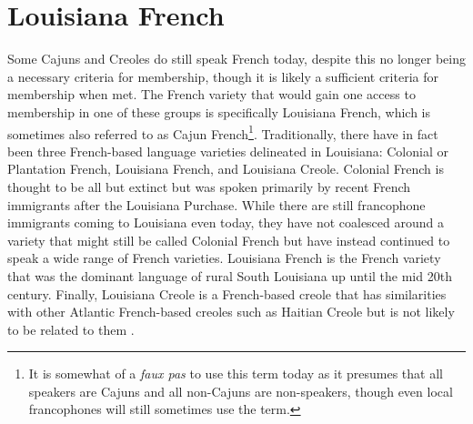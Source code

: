 \documentclass{article}\usepackage[]{graphicx}\usepackage[]{xcolor}
\newcommand{\foreign}[1]{\textit{#1}}
\begin{document}

  \section{Louisiana French}
    Some Cajuns and Creoles do still speak French today, despite this no longer being a necessary criteria for membership, though it is likely a sufficient criteria for membership when met.
    The French variety that would gain one access to membership in one of these groups is specifically Louisiana French, which is sometimes also referred to as Cajun French\footnote{
      It is somewhat of a \foreign{faux pas} to use this term today as it presumes that all speakers are Cajuns and all non-Cajuns are non-speakers, though even local francophones will still sometimes use the term.
    }.
    Traditionally, there have in fact been three French-based language varieties delineated in Louisiana: Colonial or Plantation French, Louisiana French, and Louisiana Creole.
    Colonial French is thought to be all but extinct but was spoken primarily by recent French immigrants after the Louisiana Purchase.
    While there are still francophone immigrants coming to Louisiana even today, they have not coalesced around a variety that might still be called Colonial French but have instead continued to speak a wide range of French varieties.
    Louisiana French is the French variety that was the dominant language of rural South Louisiana up until the mid 20th century.
    Finally, Louisiana Creole is a French-based creole that has similarities with other Atlantic French-based creoles such as Haitian Creole but is not likely to be related to them \parencite[pp.~280-281]{dajko_sociolinguistics_2012}.
\end{document}
